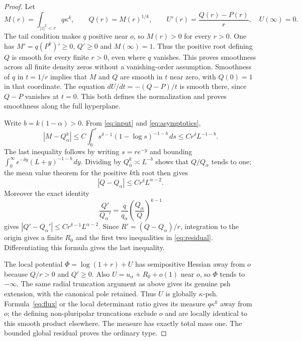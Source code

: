 \documentclass[11pt]{article}
\theoremstyle{remark}\newtheorem{remark}[theorem]{Remark}
\begin{document}
\begin{proof}
Let
\begin{equation}\label{eq:inverse}
 M(r)=\int_{|z|^2<r}q\kappa^k,
 \qquad Q(r)=M(r)^{1/k},
 \qquad U'(r)=\frac{Q(r)-P(r)}r,
 \quad U(\infty)=0.
\end{equation}
The tail condition makes $q$ positive near $o$, so $M(r)>0$ for every
$r>0$. One has $M'=q(P^k)'\ge0$, $Q'\ge0$ and $M(\infty)=1$.
Thus the positive root defining $Q$ is smooth for every finite $r>0$,
even where $q$ vanishes. This proves smoothness across all finite density
zeros without a vanishing-order assumption.
Smoothness of $q$ in $t=1/r$ implies that $M$ and $Q$ are smooth
in $t$ near zero, with $Q(0)=1$ in that coordinate. The equation
$dU/dt=-(Q-P)/t$ is smooth there, since $Q-P$ vanishes at
$t=0$. This both defines the normalization and proves smoothness
along the full hyperplane.

Write $b=k(1-\alpha)>0$. From \eqref{eq:input} and
\eqref{eq:asymptotics},
\begin{equation}\label{eq:tail}
 |M-Q_\alpha^k|
 \le C\int_0^r s^{\delta-1}(1-\log s)^{-1-b}\,ds
 \le Cr^\delta L^{-1-b}.
\end{equation}
The last inequality follows by writing $s=re^{-y}$ and bounding
$\int_0^\infty e^{-\delta y}(L+y)^{-1-b}\,dy$.
Dividing by $Q_\alpha^k\asymp L^{-b}$ shows that $Q/Q_\alpha$
tends to one; the mean value theorem for the positive $k$th root
then gives
\begin{equation}\label{eq:Qerror}
 |Q-Q_\alpha|\le Cr^\delta L^{\alpha-2}.
\end{equation}
Moreover the exact identity
\[
 \frac{Q'}{Q_\alpha'}=
 \frac q{q_\alpha}\left(\frac{Q_\alpha}{Q}\right)^{k-1}
\]
gives $|Q'-Q_\alpha'|\le Cr^{\delta-1}L^{\alpha-2}$.
Since $R'=(Q-Q_\alpha)/r$, integration to the origin gives a finite
$R_0$ and the first two inequalities in \eqref{eq:residual}.
Differentiating this formula gives the last inequality.

The local potential $\Phi=\log(1+r)+U$ has semipositive
Hessian away from $o$ because $Q/r>0$ and $Q'\ge0$. Also
$U=u_\alpha+R_0+o(1)$ near $o$, so $\Phi$ tends to $-\infty$.
The same radial truncation argument as above gives its genuine psh
extension, with the canonical pole retained. Thus $U$ is globally
$\kappa$-psh. Formula~\eqref{eq:flux} or the local determinant
ratio gives its measure $q\kappa^k$ away from $o$; the defining
non-pluripolar truncations exclude $o$ and are locally identical
to this smooth product elsewhere. The measure has exactly total
mass one. The bounded global residual proves the ordinary type.


\end{proof}
\end{document}
